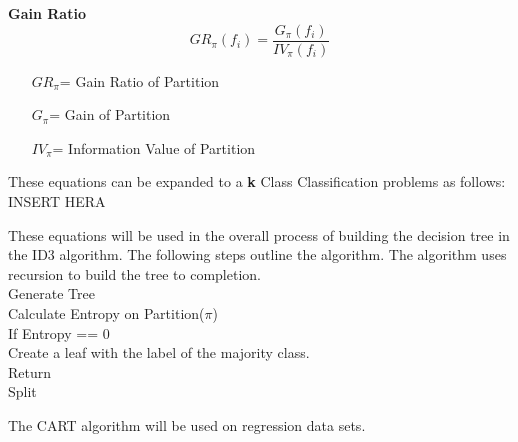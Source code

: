 \documentclass[twoside,11pt]{article}
\begin{document}
\textbf{Gain Ratio}
\begin{equation}
	GR_\pi(f_i)  = \frac{G_\pi(f_i)}{IV_\pi(f_i)}
\end{equation}
\begin{itemize}
	\item[$GR_\pi$=] Gain Ratio of Partition
	\item[$G_\pi$=] Gain of Partition
	\item[$IV_\pi$=] Information Value of Partition
\end{itemize}

These equations can be expanded to a \textbf{k} Class Classification problems as follows:\newline
INSERT HERA\newline
\newpage

These equations will be used in the overall process of building the decision tree in the ID3 algorithm. The following steps outline the algorithm. The algorithm uses recursion to build the tree to completion.\\
Generate Tree\\
Calculate Entropy on Partition($\pi$) \\
If Entropy == 0\\ 
\hspace*{1mm} Create a leaf with the label of the majority class.\\
\hspace*{1mm} Return\\
Split



\newpage
The CART algorithm will be used on regression data sets. 
\end{document}
